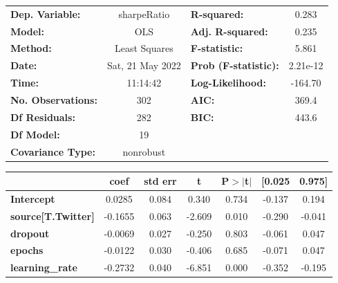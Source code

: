 \begin{center}
\begin{tabular}{lclc}
\toprule
\textbf{Dep. Variable:}                   &   sharpeRatio    & \textbf{  R-squared:         } &     0.283   \\
\textbf{Model:}                           &       OLS        & \textbf{  Adj. R-squared:    } &     0.235   \\
\textbf{Method:}                          &  Least Squares   & \textbf{  F-statistic:       } &     5.861   \\
\textbf{Date:}                            & Sat, 21 May 2022 & \textbf{  Prob (F-statistic):} &  2.21e-12   \\
\textbf{Time:}                            &     11:14:42     & \textbf{  Log-Likelihood:    } &   -164.70   \\
\textbf{No. Observations:}                &         302      & \textbf{  AIC:               } &     369.4   \\
\textbf{Df Residuals:}                    &         282      & \textbf{  BIC:               } &     443.6   \\
\textbf{Df Model:}                        &          19      & \textbf{                     } &             \\
\textbf{Covariance Type:}                 &    nonrobust     & \textbf{                     } &             \\
\bottomrule
\end{tabular}
\begin{tabular}{lcccccc}
                                          & \textbf{coef} & \textbf{std err} & \textbf{t} & \textbf{P$> |$t$|$} & \textbf{[0.025} & \textbf{0.975]}  \\
\midrule
\textbf{Intercept}                        &       0.0285  &        0.084     &     0.340  &         0.734        &       -0.137    &        0.194     \\
\textbf{source[T.Twitter]}                &      -0.1655  &        0.063     &    -2.609  &         0.010        &       -0.290    &       -0.041     \\
\textbf{dropout}                          &      -0.0069  &        0.027     &    -0.250  &         0.803        &       -0.061    &        0.047     \\
\textbf{epochs}                           &      -0.0122  &        0.030     &    -0.406  &         0.685        &       -0.071    &        0.047     \\
\textbf{learning\_rate}                   &      -0.2732  &        0.040     &    -6.851  &         0.000        &       -0.352    &       -0.195     \\

\end{tabular}
\end{center}

